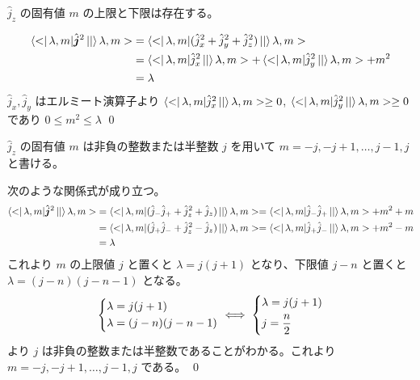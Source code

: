 \documentclass[uplatex,dvipdfmx,a4paper,11pt]{jlreq}
\makeatletter
\numberwithin{equation}{section}
\theoremstyle{definition}
\renewenvironment{proof}[1][\proofname]{\par
  \normalfont
  \topsep6\p@\@plus6\p@ \trivlist
  \item[\hskip\labelsep{\bfseries #1}\@addpunct{\bfseries}]\ignorespaces\quad\par
}{%
  \qed\endtrivlist\@endpefalse
}
\renewcommand\proofname{証明}
\makeatother
\begin{document}
\begin{proposition}
  $\hat{j}_z$ の固有値 $m$ の上限と下限は存在する。
\end{proposition}
\begin{proof}
  \begin{align}
    \bra<\lambda, m|\hat{\bm{j}}^2\ket|\lambda, m> & = \bra<\lambda, m|(\hat{j}_x^2 + \hat{j}_y^2 + \hat{j}_z^2)\ket|\lambda, m>                       \\
                                                   & = \bra<\lambda, m|\hat{j}_x^2\ket|\lambda, m> + \bra<\lambda, m|\hat{j}_y^2\ket|\lambda, m> + m^2 \\
                                                   & = \lambda
  \end{align}
  $\hat{j}_x, \hat{j}_y$ はエルミート演算子より $\bra<\lambda, m|\hat{j}_x^2\ket|\lambda, m> \geq 0$, $\bra<\lambda, m|\hat{j}_y^2\ket|\lambda, m> \geq 0$ であり $0 \leq m^2 \leq \lambda$
\end{proof}

\begin{proposition}
  $\hat{j}_z$ の固有値 $m$ は非負の整数または半整数 $j$ を用いて $m = -j,-j+1,\ldots,j-1,j$ と書ける。
\end{proposition}
\begin{proof}
  次のような関係式が成り立つ。
  \begin{align}
    \bra<\lambda, m|\hat{\bm{j}}^2\ket|\lambda, m> & = \bra<\lambda, m|(\hat{j}_-\hat{j}_+ + \hat{j}_z^2 + \hat{j}_z)\ket|\lambda, m> = \bra<\lambda, m|\hat{j}_-\hat{j}_+\ket|\lambda, m> + m^2 + m \\
                                                   & = \bra<\lambda, m|(\hat{j}_+\hat{j}_- + \hat{j}_z^2 - \hat{j}_z)\ket|\lambda, m> = \bra<\lambda, m|\hat{j}_+\hat{j}_-\ket|\lambda, m> + m^2 - m \\
                                                   & = \lambda
  \end{align}
  これより $m$ の上限値 $j$ と置くと $\lambda = j(j + 1)$ となり、下限値 $j - n$ と置くと $\lambda = (j - n)(j - n - 1)$ となる。
  \begin{align}
    \begin{dcases}
      \lambda = j(j + 1) \\
      \lambda = (j - n)(j - n - 1)
    \end{dcases}
    \iff
    \begin{dcases}
      \lambda = j(j + 1) \\
      j = \frac{n}{2}
    \end{dcases}
  \end{align}
  より $j$ は非負の整数または半整数であることがわかる。これより $m = -j, -j + 1,\ldots, j-1, j$ である。
\end{proof}
\end{document}
